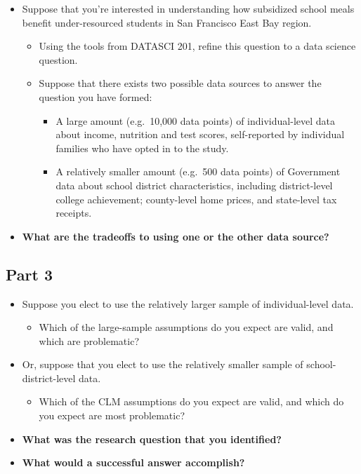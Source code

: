 \documentclass[
]{book}
\providecommand{\tightlist}{%
  \setlength{\itemsep}{0pt}\setlength{\parskip}{0pt}}
\theoremstyle{definition}
\theoremstyle{definition}
\theoremstyle{definition}
\theoremstyle{definition}
\theoremstyle{remark}
\begin{document}
\begin{itemize}
\tightlist
\item
  Suppose that you're interested in understanding how subsidized school meals benefit under-resourced students in San Francisco East Bay region.

  \begin{itemize}
  \tightlist
  \item
    Using the tools from DATASCI 201, refine this question to a data science question.
  \item
    Suppose that there exists two possible data sources to answer the question you have formed:

    \begin{itemize}
    \tightlist
    \item
      A large amount (e.g.~10,000 data points) of individual-level data about income, nutrition and test scores, self-reported by individual families who have opted in to the study.\\
    \item
      A relatively smaller amount (e.g.~500 data points) of Government data about school district characteristics, including district-level college achievement; county-level home prices, and state-level tax receipts.
    \end{itemize}
  \end{itemize}
\item
  \textbf{What are the tradeoffs to using one or the other data source?}\\
\end{itemize}

\hypertarget{part-3-1}{%
\subsection{Part 3}\label{part-3-1}}

\begin{itemize}
\tightlist
\item
  Suppose you elect to use the relatively larger sample of individual-level data.

  \begin{itemize}
  \tightlist
  \item
    Which of the large-sample assumptions do you expect are valid, and which are problematic?
  \end{itemize}
\item
  Or, suppose that you elect to use the relatively smaller sample of school-district-level data.

  \begin{itemize}
  \tightlist
  \item
    Which of the CLM assumptions do you expect are valid, and which do you expect are most problematic?
  \end{itemize}
\item
  \textbf{What was the research question that you identified?}
\item
  \textbf{What would a successful answer accomplish?}
\end{itemize}
\end{document}

